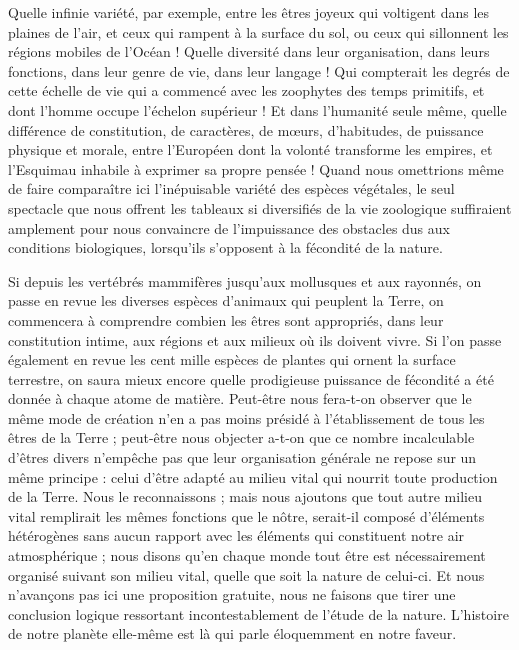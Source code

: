 \documentclass[a4paper, 11pt, oneside, landscape]{article}
\begin{document}
Quelle infinie variété, par exemple, entre les êtres joyeux qui voltigent dans les plaines de l'air, et ceux qui rampent à la surface du sol, ou ceux qui sillonnent les régions mobiles de l'Océan ! Quelle diversité dans leur organisation, dans leurs fonctions, dans leur genre de vie, dans leur langage ! Qui compterait les degrés de cette échelle de vie qui a commencé avec les zoophytes des temps primitifs, et dont l'homme occupe l'échelon supérieur ! Et dans l'humanité seule même, quelle différence de constitution, de caractères, de mœurs, d'habitudes, de puissance physique et morale, entre l'Européen dont la volonté transforme les empires, et l'Esquimau inhabile à exprimer sa propre pensée ! Quand nous omettrions même de faire comparaître ici l'inépuisable variété des espèces végétales, le seul spectacle que nous offrent les tableaux si diversifiés de la vie zoologique suffiraient amplement pour nous convaincre de l'impuissance des obstacles dus aux conditions biologiques, lorsqu'ils s'opposent à la fécondité de la nature.

Si depuis les vertébrés mammifères jusqu'aux mollusques et aux rayonnés, on passe en revue les diverses espèces d'animaux qui peuplent la Terre, on commencera à comprendre combien les êtres sont appropriés, dans leur constitution intime, aux régions et aux milieux où ils doivent vivre. Si l'on passe également en revue les cent mille espèces de plantes qui ornent la surface terrestre, on saura mieux encore quelle prodigieuse puissance de fécondité a été donnée à chaque atome de matière. Peut-être nous fera-t-on observer que le même mode de création n'en a pas moins présidé à l'établissement de tous les êtres de la Terre ; peut-être nous objecter a-t-on que ce nombre incalculable d'êtres divers n'empêche pas que leur organisation générale ne repose sur un même principe : celui d'être adapté au milieu vital qui nourrit toute production de la Terre. Nous le reconnaissons ; mais nous ajoutons que tout autre milieu vital remplirait les mêmes fonctions que le nôtre, serait-il composé d'éléments hétérogènes sans aucun rapport avec les éléments qui constituent notre air atmosphérique ; nous disons qu'en chaque monde tout être est nécessairement organisé suivant son milieu vital, quelle que soit la nature de celui-ci. Et nous n'avançons pas ici une proposition gratuite, nous ne faisons que tirer une conclusion logique ressortant incontestablement de l'étude de la nature. L'histoire de notre planète elle-même est là qui parle éloquemment en notre faveur.
\end{document}

